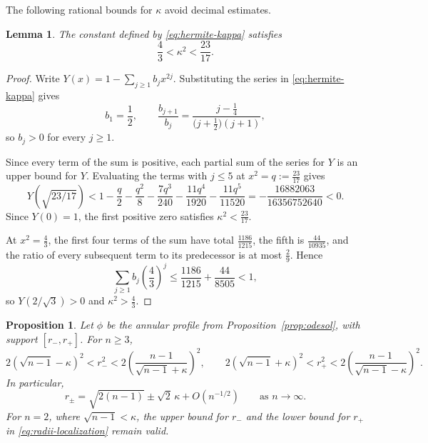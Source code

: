 \documentclass[11pt]{article}
\numberwithin{equation}{section}
\newtheorem{proposition}[theorem]{Proposition}
\newtheorem{lemma}[theorem]{Lemma}
\theoremstyle{definition}
\begin{document}
The following rational bounds for $\kappa$ avoid decimal estimates.

\begin{lemma}\label{lem:kappa-bounds}
The constant defined by \eqref{eq:hermite-kappa} satisfies
\begin{equation}\label{eq:kappa-bounds}
    \frac43<\kappa^2<\frac{23}{17}.
\end{equation}
\end{lemma}

\begin{proof}
Write $Y(x)=1-\sum_{j\geq1}b_jx^{2j}$. Substituting the series in \eqref{eq:hermite-kappa} gives
\[
    b_1=\frac12,
    \qquad
    \frac{b_{j+1}}{b_j}=\frac{j-\frac14}{\bigl(j+\frac12\bigr)(j+1)},
\]
so $b_j>0$ for every $j\geq1$.

Since every term of the sum is positive, each partial sum of the series for $Y$ is an upper bound for $Y$. Evaluating the terms with $j\leq5$ at $x^2=q:=\tfrac{23}{17}$ gives
\[
    Y\!\left(\sqrt{23/17}\right)
    <
    1-\frac q2-\frac{q^2}8-\frac{7q^3}{240}-\frac{11q^4}{1920}-\frac{11q^5}{11520}
    =
    -\frac{16882063}{16356752640}
    <0.
\]
Since $Y(0)=1$, the first positive zero satisfies $\kappa^2<\frac{23}{17}$.

At $x^2=\frac43$, the first four terms of the sum have total $\frac{1186}{1215}$, the fifth is $\frac{44}{10935}$, and the ratio of every subsequent term to its predecessor is at most $\frac29$. Hence
\[
    \sum_{j\geq1}b_j\left(\frac43\right)^j
    \leq
    \frac{1186}{1215}+\frac{44}{8505}<1,
\]
so $Y(2/\sqrt3)>0$ and $\kappa^2>\frac43$.
\end{proof}


\begin{proposition}\label{prop:annulus-localization}
Let $\phi$ be the annular profile from Proposition~\ref{prop:odesol}, with support $[r_-,r_+]$. For $n\geq3$,
\begin{equation}\label{eq:radii-localization}
    2\left(\sqrt{n-1}-\kappa\right)^2<r_-^2<2\left(\frac{n-1}{\sqrt{n-1}+\kappa}\right)^2,
    \qquad
    2\left(\sqrt{n-1}+\kappa\right)^2<r_+^2<2\left(\frac{n-1}{\sqrt{n-1}-\kappa}\right)^2.
\end{equation}
In particular,
\begin{equation}\label{eq:radii-asymptotics}
    r_\pm=\sqrt{2(n-1)}\pm\sqrt2\,\kappa+O(n^{-1/2})
    \qquad\text{as }n\to\infty.
\end{equation}
For $n=2$, where $\sqrt{n-1}<\kappa$, the upper bound for $r_-$ and the lower bound for $r_+$ in \eqref{eq:radii-localization} remain valid.
\end{proposition}
\end{document}
